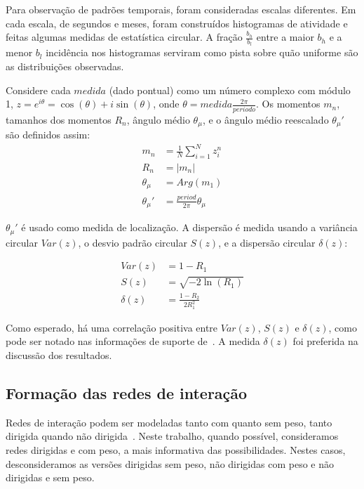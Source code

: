 \documentclass[a4paper,openright,12pt]{report} %
\begin{document}
Para observação de padrões temporais, foram consideradas escalas diferentes.
Em cada escala, de segundos e meses, foram construídos histogramas de atividade
e feitas algumas medidas de estatística circular.
A fração $\frac{b_h}{b_l}$ entre a maior $b_h $ e a menor $b_l$ incidência nos histogramas
serviram como pista sobre quão uniforme são as distribuições observadas.

Considere cada $ medida $ (dado pontual) como um número complexo com módulo 1, $z=e^{i\theta}=\cos(\theta)+i\sin(\theta)$, onde $\theta= medida \frac{2\pi}{periodo}$. Os momentos $m_n$, tamanhos dos momentos $R_n$, ângulo médio $\theta_\mu$, e o ângulo médio reescalado $\theta_\mu'$ são definidos assim:
\begin{align}\label{eq:cmom}
	m_n&=\frac{1}{N}\sum_{i=1}^N z_i^n \nonumber\\
	R_n&=|m_n|\\
	\theta_\mu&=Arg(m_1) \nonumber \\
	\theta_\mu'&=\frac{period}{2\pi} \theta_\mu \nonumber
\end{align}

$\theta_\mu'$ é usado como medida de localização. A dispersão é medida usando a variância circular $Var(z)$, 
o desvio padrão circular $S(z)$, e a dispersão circular $\delta(z)$:

\begin{align}\label{eq:cmd}
	Var(z)&=1 - R_1 \nonumber\\
	S(z)&= \sqrt{-2\ln(R_1)}\\
	\delta(z)&=\frac{1-R_2}{2 R_1^2} \nonumber
\end{align}

Como esperado, há uma correlação positiva entre $Var(z)$, $S(z)$ e $\delta(z)$,
como pode ser notado nas informações de suporte de~\cite{timeS}.
A medida $\delta(z)$ foi preferida na discussão dos resultados.

\subsection{Formação das redes de interação}\label{sec:intNet}
Redes de interação podem ser modeladas tanto com quanto sem peso, tanto dirigida quando não dirigida~\cite{bird,newmanCommunityDirected,newmanCommunity2013,newmanBook}.
Neste trabalho, quando possível, consideramos redes dirigidas e com peso, a mais informativa das possibilidades.
Nestes casos, desconsideramos as versões dirigidas sem peso, não dirigidas com peso e não dirigidas e sem peso.
\end{document}
